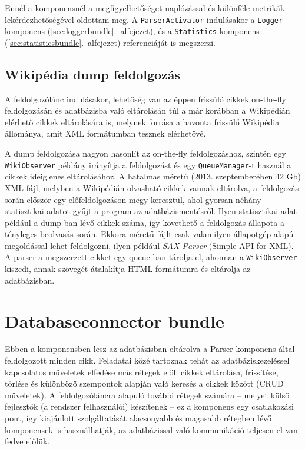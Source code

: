 Ennél a komponensnél a  megfigyelhetőséget naplózással és különféle metrikák lekérdezhetőségével oldottam meg. A \texttt{ParserActivator} indulásakor a \texttt{Logger} komponens (\ref{sec:loggerbundle}.~alfejezet), és a \texttt{Statistics} komponens (\ref{sec:statisticsbundle}.~alfejezet) referenciáját is megszerzi.

\subsection{Wikipédia dump feldolgozás}
\label{sub:dumpprocessing}

A feldolgozólánc indulásakor, lehetőség van az éppen frissülő cikkek on-the-fly feldolgozásán és adatbázisba való eltárolásán túl a már korábban a Wikipédián elérhető cikkek eltárolására is, melynek forrása a havonta frissülő Wikipédia állománya, amit XML formátumban tesznek elérhetővé.

A dump feldolgozása nagyon hasonlít az on-the-fly feldolgozáshoz, szintén egy \texttt{WikiObserver} példány irányítja a feldolgozást és egy \texttt{QueueManager}-t használ a cikkek ideiglenes eltárolásához. A hatalmas méretű (2013. szeptemberében 42 Gb) XML fájl, melyben a Wikipédián olvasható cikkek vannak eltárolva, a feldolgozás során először egy előfeldolgozáson megy keresztül, ahol gyorsan néhány statisztikai adatot gyűjt a program az adatbázismentésről. Ilyen statisztikai adat például a dump-ban lévő cikkek száma, így követhető a feldolgozás állapota a tényleges beolvasás során. Ekkora méretű fájlt csak valamilyen állapotgép alapú megoldással lehet feldolgozni, ilyen például \textit{SAX Parser} (Simple API for XML). A parser a megszerzett cikket egy queue-ban tárolja el, ahonnan a \texttt{WikiObserver} kiszedi, annak szövegét átalakítja HTML formátumra és eltárolja az adatbázisban.



\section{Databaseconnector bundle}
\label{sec:dbconnectorbundle}
    
Ebben a komponensben lesz az adatbázisban eltárolva a Parser komponens által feldolgozott minden cikk. Feladatai közé tartoznak tehát az adatbáziskezeléssel kapcsolatos műveletek elfedése más rétegek elől: cikkek eltárolása, frissítése, törlése és különböző szempontok alapján való keresés a cikkek között (CRUD műveletek). A feldolgozóláncra alapuló további rétegek számára -- melyet külső fejlesztők (a rendszer felhasználói) készítenek -- ez a komponens egy csatlakozási pont, így kiajánlott szolgáltatását alacsonyabb és magasabb rétegben lévő komponensek is használhatják, az adatbázissal való kommunikáció teljesen el van fedve előlük.

